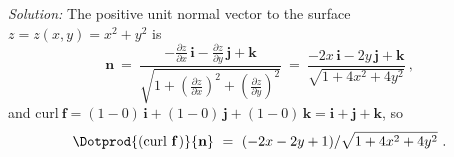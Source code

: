 \begin{exa}
 \par\noindent\emph{Solution:} The positive unit normal vector to the surface\\$z=z(x,y)=x^2 + y^2$ is
 \begin{displaymath}
  \textbf{n} ~=~
   \frac{-\frac{\partial z}{\partial x}\,\textbf{i} - \frac{\partial z}{\partial y}\,\textbf{j} +
   \textbf{k}}{\sqrt{1 + \left( \tfrac{\partial z}{\partial x} \right)^2 +
   \left( \tfrac{\partial z}{\partial y} \right)^2}} ~=~
   \frac{-2x\,\textbf{i} - 2y\,\textbf{j} + \textbf{k}}{\sqrt{1 + 4x^2 + 4y^2}} ~,
 \end{displaymath}
 and $\text{curl}~\textbf{f}= (1-0)\,\textbf{i}+(1-0)\,\textbf{j}+(1-0)\,\textbf{k} = \textbf{i}+\textbf{j}+\textbf{k}$,
 so
 \begin{displaymath}
  \Dotprod{(\text{curl}~{\textbf{f}}\,)}{\textbf{n}} ~=~ (-2x-2y+1)/\sqrt{1 + 4x^2 + 4y^2} ~.
 \end{displaymath}
 

\end{exa}
